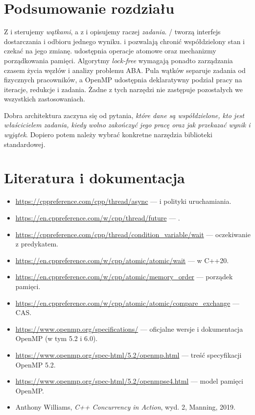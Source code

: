 \section*{Podsumowanie rozdziału}

Z  i  sterujemy \emph{wątkami},
a z  i  opisujemy raczej
\emph{zadania}. / tworzą interfejs dostarczania
i odbioru jednego wyniku.  i 
pozwalają chronić współdzielony stan i czekać na jego zmianę.
 udostępnia operacje atomowe oraz mechanizmy porządkowania
pamięci. Algorytmy \emph{lock-free} wymagają ponadto zarządzania czasem
życia węzłów i analizy problemu ABA. Pula wątków separuje zadania
od fizycznych pracowników, a OpenMP udostępnia deklaratywny podział
pracy na iteracje, redukcje i zadania. Żadne z tych narzędzi nie
zastępuje pozostałych we wszystkich zastosowaniach.

Dobra architektura zaczyna się od pytania, \emph{które dane są współdzielone,
kto jest właścicielem zadania, kiedy wolno zakończyć jego pracę oraz
jak przekazać wynik i wyjątek}. Dopiero potem należy wybrać konkretne
narzędzia biblioteki standardowej.

\section*{Literatura i dokumentacja}

\begin{itemize}
\item \url{https://cppreference.com/cpp/thread/async} ---  i polityki uruchamiania.
\item \url{https://en.cppreference.com/w/cpp/thread/future} --- .
\item \url{https://cppreference.com/cpp/thread/condition_variable/wait} --- oczekiwanie z predykatem.
\item \url{https://en.cppreference.com/w/cpp/atomic/atomic/wait} ---  w C++20.
\item \url{https://en.cppreference.com/w/cpp/atomic/memory_order} --- porządek pamięci.
\item \url{https://en.cppreference.com/w/cpp/atomic/atomic/compare_exchange} --- CAS.
\item \url{https://www.openmp.org/specifications/} --- oficjalne wersje i dokumentacja OpenMP (w tym 5.2 i 6.0).
\item \url{https://www.openmp.org/spec-html/5.2/openmp.html} --- treść specyfikacji OpenMP 5.2.
\item \url{https://www.openmp.org/spec-html/5.2/openmpse4.html} --- model pamięci OpenMP.
\item Anthony Williams, \emph{C++ Concurrency in Action}, wyd. 2, Manning, 2019.
\end{itemize}
